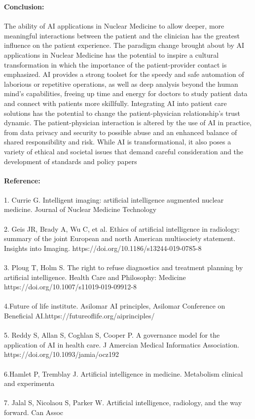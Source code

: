 \documentclass[12pt]{article}
\begin{document}
\noindent \textbf{\large Conclusion:} \\ \\ The ability of AI applications in Nuclear Medicine to allow deeper, more meaningful interactions between the
patient and the clinician has the greatest influence on the patient experience. The paradigm change brought
about by AI applications in Nuclear Medicine has the potential to inspire a cultural transformation in which the
importance of the patient-provider contact is emphasized. AI provides a strong toolset for the speedy and safe
automation of laborious or repetitive operations, as well as deep analysis beyond the human mind's capabilities, freeing up time and energy for doctors to study patient data and connect with patients more skillfully.
Integrating AI into patient care solutions has the potential to change the patient-physician relationship's trust
dynamic. The patient-physician interaction is altered by the use of AI in practice, from data privacy and security
to possible abuse and an enhanced balance of shared responsibility and risk. While AI is transformational, it also
poses a variety of ethical and societal issues that demand careful consideration and the development of
standards and policy papers\\ \\ 

 

\noindent \textbf{\large Reference:} \\ \\  1. Currie G. Intelligent imaging: artificial intelligence augmented nuclear medicine. Journal of Nuclear
Medicine Technology\\ \\
 2. Geis JR, Brady A, Wu C, et al. Ethics of artificial intelligence in radiology: summary of the joint European and
north American multisociety statement. Insights into Imaging. https://doi.org/10.1186/s13244-019-0785-8\\ \\
 3. Ploug T, Holm S. The right to refuse diagnostics and treatment planning by artificial intelligence. Health
Care and Philosophy: Medicine https://doi.org/10.1007/s11019-019-09912-8\\ \\
 4.Future of life institute. Asilomar AI principles, Asilomar Conference on Beneficial
AI.https://futureoflife.org/aiprinciples/\\ \\ 5. Reddy S, Allan S, Coghlan S, Cooper P. A governance model for the application of AI in health care. J
Amercian Medical Informatics Association. https://doi.org/10.1093/jamia/ocz192\\ \\
 6.Hamlet P, Tremblay J. Artificial intelligence in medicine. Metabolism clinical and experimenta\\ \\
 7. Jalal S, Nicolaou S, Parker W. Artificial intelligence, radiology, and the way forward. Can Assoc\\ \\

\end{document}
